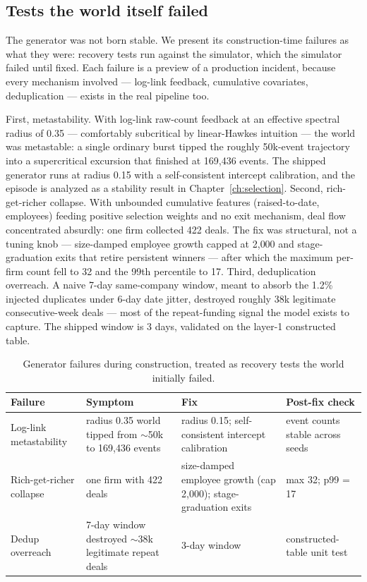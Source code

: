 \subsection{Tests the world itself failed}
\label{sec:cp-generator}

The generator was not born stable. We present its construction-time failures as what they were: recovery
tests run against the simulator, which the simulator failed until fixed. Each failure is a preview of a
production incident, because every mechanism involved --- log-link feedback, cumulative covariates,
deduplication --- exists in the real pipeline too.

First, metastability. With log-link raw-count feedback at an effective spectral radius of 0.35 ---
comfortably subcritical by linear-Hawkes intuition --- the world was metastable: a single ordinary burst
tipped the roughly 50k-event trajectory into a supercritical excursion that finished at 169{,}436 events.
The shipped generator runs at radius 0.15 with a self-consistent intercept calibration, and the episode is
analyzed as a stability result in Chapter~\ref{ch:selection}. Second, rich-get-richer collapse. With
unbounded cumulative features (raised-to-date, employees) feeding positive selection weights and no exit
mechanism, deal flow concentrated absurdly: one firm collected 422 deals. The fix was structural, not a
tuning knob --- size-damped employee growth capped at 2{,}000 and stage-graduation exits that retire
persistent winners --- after which the maximum per-firm count fell to 32 and the 99th percentile to 17.
Third, deduplication overreach. A naive 7-day same-company window, meant to absorb the 1.2\% injected
duplicates under 6-day date jitter, destroyed roughly 38k legitimate consecutive-week deals --- most of the
repeat-funding signal the model exists to capture. The shipped window is 3 days, validated on the layer-1
constructed table.

\begin{table}[htbp]
\centering
\footnotesize
\begin{tabular}{p{3.2cm}p{4.1cm}p{4.0cm}p{2.9cm}}
\toprule
Failure & Symptom & Fix & Post-fix check \\
\midrule
Log-link metastability & radius 0.35 world tipped from $\sim$50k to 169{,}436 events &
radius 0.15; self-consistent intercept calibration & event counts stable across seeds \\
Rich-get-richer collapse & one firm with 422 deals & size-damped employee growth (cap 2{,}000);
stage-graduation exits & max 32; p99 = 17 \\
Dedup overreach & 7-day window destroyed $\sim$38k legitimate repeat deals & 3-day window &
constructed-table unit test \\
\bottomrule
\end{tabular}
\caption{Generator failures during construction, treated as recovery tests the world initially failed.}
\label{tab:cp-generator}
\end{table}

